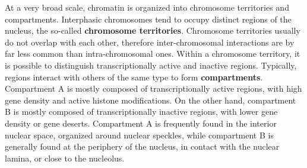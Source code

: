 At a very broad scale, chromatin is organized into chromosome territories and compartments. Interphasic chromosomes tend to occupy distinct regions of the nucleus, the so-called \textbf{chromosome territories}\cite{chromosometerritories2010}. Chromosome territories usually do not overlap with each other, therefore inter-chromosomal interactions are by far less common than intra-chromosomal ones. Within a chromosome territory, it is possible to distinguish transcriptionally active and inactive regions. Typically, regions interact with others of the same type to form \textbf{compartments}.
Compartment A is mostly composed of transcriptionally active regions, with high gene density and active histone modifications. On the other hand, compartment B is mostly composed of transcriptionally inactive regions, with lower gene density or gene deserts\cite{chromatindevelopment2019}. Compartment A is frequently found in the interior nuclear space, organized around nuclear speckles, while compartment B is generally found at the periphery of the nucleus, in contact with the nuclear lamina, or close to the nucleolus\cite{chromatinorganization2019, chromatindevelopment2019}.

